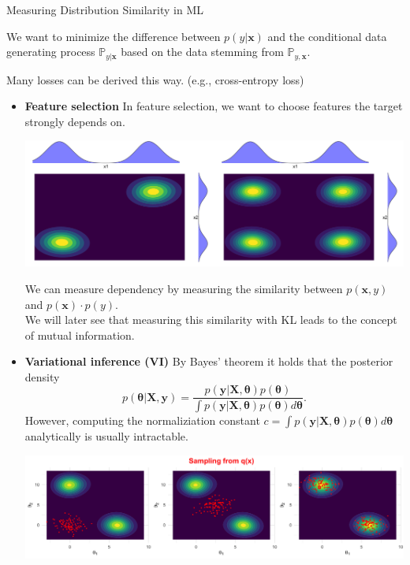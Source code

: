 \documentclass[11pt,compress,t,notes=noshow, xcolor=table]{beamer}
\begin{document}
\begin{vbframe} {Measuring Distribution Similarity in ML}
\begin{itemize}
We want to minimize the difference between $p(y \vert \mathbf{x})$ and the conditional data generating process $\mathbb{P}_{y\vert\mathbf{x}}$ based on the data stemming from $\mathbb{P}_{y, \mathbf{x}}.$

\lz

Many losses can be derived this way. (e.g., cross-entropy loss)

\end{itemize}

\framebreak

\begin{itemize}
    \item \textbf{Feature selection}
In feature selection, we want to choose features the target strongly depends on. 

\begin{center}
\includegraphics[width=0.9\linewidth]{figure/gaussian_mixture_with_marginals.png}
\end{center}

We can measure dependency by measuring the similarity between $p(\mathbf{x}, y)$ and $p(\mathbf{x})\cdot p(y).$ \\
\lz
We will later see that measuring this similarity with KL  leads to the concept of mutual information.

\end{itemize}

\framebreak

\begin{itemize}
    \item \textbf{Variational inference (VI)}
By Bayes' theorem it holds that the posterior density $$p(\bm{\theta}\vert \mathbf{X}, \mathbf{y}) = \frac{p(\mathbf{y}|\mathbf{X}, \bm{\theta})p(\bm{\theta})}{\int p(\mathbf{y}|\mathbf{X}, \bm{\theta})p(\bm{\theta})d\bm{\theta}}.$$ However, computing the normaliziation constant $c = \int p(\mathbf{y}|\mathbf{X}, \bm{\theta})p(\bm{\theta})d\bm{\theta}$ analytically is usually intractable.

\begin{center}
\includegraphics[width=0.99\linewidth]{figure/gaussian_mixture_scatter.png}
\end{center}


\end{itemize}
\end{vbframe}
\end{document}
